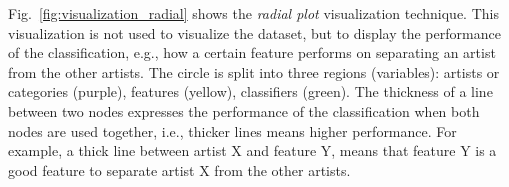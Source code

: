 Fig.~\ref{fig:visualization_radial} shows the \textit{radial plot} visualization technique.
This visualization is not used to visualize the dataset, but to display the performance of the classification, e.g., how a certain feature performs on separating an artist from the other artists.
The circle is split into three regions (variables): artists or categories (purple), features (yellow), classifiers (green).
The thickness of a line between two nodes expresses the performance of the classification when both nodes are used together, i.e., thicker lines means higher performance.
For example, a thick line between artist X and feature Y, means that feature Y is a good feature to separate artist X from the other artists.